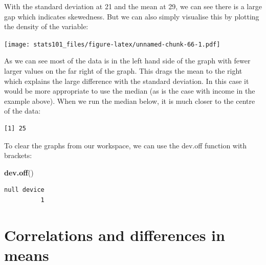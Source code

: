\documentclass[]{article}
\newenvironment{Shaded}{\begin{snugshade}}{\end{snugshade}}
\newcommand{\KeywordTok}[1]{\textcolor[rgb]{0.13,0.29,0.53}{\textbf{#1}}}
\newcommand{\NormalTok}[1]{#1}
\newcommand{\OperatorTok}[1]{\textcolor[rgb]{0.81,0.36,0.00}{\textbf{#1}}}
\begin{document}
With the standard deviation at 21 and the mean at 29, we can see there is a large gap which indicates skewedness. But we can also simply visualise this by plotting the density of the variable:

\begin{Shaded}
\end{Shaded}

\texttt{[image: stats101\_files/figure-latex/unnamed-chunk-66-1.pdf]}

As we can see most of the data is in the left hand side of the graph with fewer larger values on the far right of the graph. This drags the mean to the right which explains the large difference with the standard deviation. In this case it would be more appropriate to use the median (as is the case with income in the example above). When we run the median below, it is much closer to the centre of the data:

\begin{Shaded}
\end{Shaded}

\begin{verbatim}
[1] 25
\end{verbatim}

To clear the graphs from our workspace, we can use the dev.off function with brackets:

\begin{Shaded}
\begin{Highlighting}[]
\KeywordTok{dev.off}\NormalTok{()}
\end{Highlighting}
\end{Shaded}

\begin{verbatim}
null device 
          1 
\end{verbatim}

\hypertarget{correlations-and-differences-in-means}{%
\section{Correlations and differences in means}\label{correlations-and-differences-in-means}}
\end{document}
